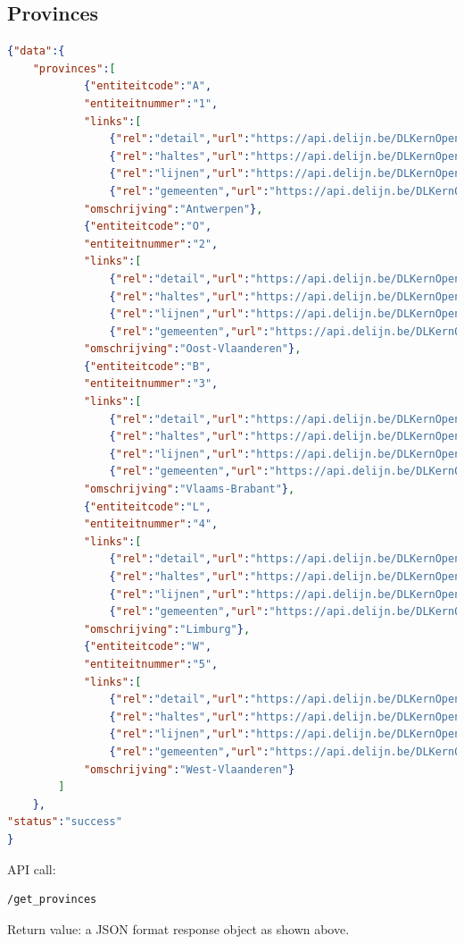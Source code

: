 \documentclass[12pt]{article}
\begin{document}
\subsection{Provinces}
\begin{lstlisting}[language=json]
{"data":{
	"provinces":[
			{"entiteitcode":"A",
			"entiteitnummer":"1",
			"links":[
				{"rel":"detail","url":"https://api.delijn.be/DLKernOpenData/api/v1/entiteiten/1"},
				{"rel":"haltes","url":"https://api.delijn.be/DLKernOpenData/api/v1/entiteiten/1/haltes"},
				{"rel":"lijnen","url":"https://api.delijn.be/DLKernOpenData/api/v1/entiteiten/1/lijnen"},
				{"rel":"gemeenten","url":"https://api.delijn.be/DLKernOpenData/api/v1/entiteiten/1/gemeenten"}],
			"omschrijving":"Antwerpen"},
			{"entiteitcode":"O",
			"entiteitnummer":"2",
			"links":[
				{"rel":"detail","url":"https://api.delijn.be/DLKernOpenData/api/v1/entiteiten/2"},
				{"rel":"haltes","url":"https://api.delijn.be/DLKernOpenData/api/v1/entiteiten/2/haltes"},
				{"rel":"lijnen","url":"https://api.delijn.be/DLKernOpenData/api/v1/entiteiten/2/lijnen"},
				{"rel":"gemeenten","url":"https://api.delijn.be/DLKernOpenData/api/v1/entiteiten/2/gemeenten"}],
			"omschrijving":"Oost-Vlaanderen"},
			{"entiteitcode":"B",
			"entiteitnummer":"3",
			"links":[
				{"rel":"detail","url":"https://api.delijn.be/DLKernOpenData/api/v1/entiteiten/3"},
				{"rel":"haltes","url":"https://api.delijn.be/DLKernOpenData/api/v1/entiteiten/3/haltes"},
				{"rel":"lijnen","url":"https://api.delijn.be/DLKernOpenData/api/v1/entiteiten/3/lijnen"},
				{"rel":"gemeenten","url":"https://api.delijn.be/DLKernOpenData/api/v1/entiteiten/3/gemeenten"}],
			"omschrijving":"Vlaams-Brabant"},
			{"entiteitcode":"L",
			"entiteitnummer":"4",
			"links":[
				{"rel":"detail","url":"https://api.delijn.be/DLKernOpenData/api/v1/entiteiten/4"},
				{"rel":"haltes","url":"https://api.delijn.be/DLKernOpenData/api/v1/entiteiten/4/haltes"},
				{"rel":"lijnen","url":"https://api.delijn.be/DLKernOpenData/api/v1/entiteiten/4/lijnen"},
				{"rel":"gemeenten","url":"https://api.delijn.be/DLKernOpenData/api/v1/entiteiten/4/gemeenten"}],
			"omschrijving":"Limburg"},
			{"entiteitcode":"W",
			"entiteitnummer":"5",
			"links":[
				{"rel":"detail","url":"https://api.delijn.be/DLKernOpenData/api/v1/entiteiten/5"},
				{"rel":"haltes","url":"https://api.delijn.be/DLKernOpenData/api/v1/entiteiten/5/haltes"},
				{"rel":"lijnen","url":"https://api.delijn.be/DLKernOpenData/api/v1/entiteiten/5/lijnen"},
				{"rel":"gemeenten","url":"https://api.delijn.be/DLKernOpenData/api/v1/entiteiten/5/gemeenten"}],
			"omschrijving":"West-Vlaanderen"}
		]
	},
"status":"success"
}
\end{lstlisting}
API call:
\begin{lstlisting}[style=DOS]
/get_provinces
\end{lstlisting}
Return value: a JSON format response object as shown above.
\newpage
\end{document}
